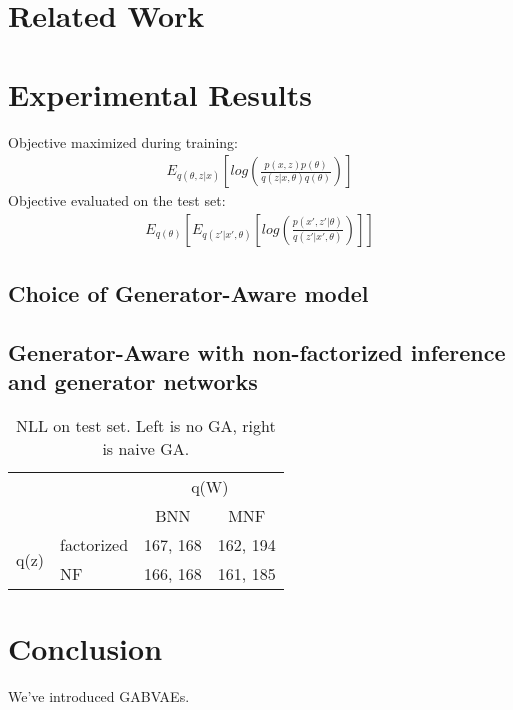 \documentclass{article}
\begin{document}
\section{Related Work}

\section{Experimental Results}


Objective maximized during training:
\begin{align}
 E_{q(\theta,z|x)} \left[ log \left( \frac{p(x,z)p(\theta)}{q(z|x,\theta)q(\theta)} \right) \right ] 
\end{align}
Objective evaluated on the test set:
\begin{align}
 E_{q(\theta)} \left[ E_{q(z'|x',\theta)} \left[ log \left( \frac{p(x',z'|\theta)}{q(z'|x',\theta)} \right) \right ] \right ] 
\end{align}

\subsection{Choice of Generator-Aware model}

\subsection{Generator-Aware with non-factorized inference and generator networks}

\begin{table}[h]
\centering
\label{table_ga}
\begin{tabular}{llcc}
                                           &            & \multicolumn{2}{c}{q(W)} \\ \cline{3-4} 
                                           &            & BNN         & MNF        \\
\multicolumn{1}{c|}{\multirow{2}{*}{q(z)}} & factorized & 167, 168    & 162, 194    \\
\multicolumn{1}{c|}{}                      & NF         & 166, 168     & 161, 185   
\end{tabular}
\caption{NLL on test set. Left is no GA, right is naive GA. }
\end{table}

\section{Conclusion}

We've introduced GABVAEs.
\end{document}
